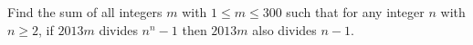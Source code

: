 Find the sum of all integers $m$ with $1 \le m \le 300$ such that for any integer $n$ with $n \ge 2$, if $2013m$ divides $n^n-1$ then $2013m$ also divides $n-1$.

